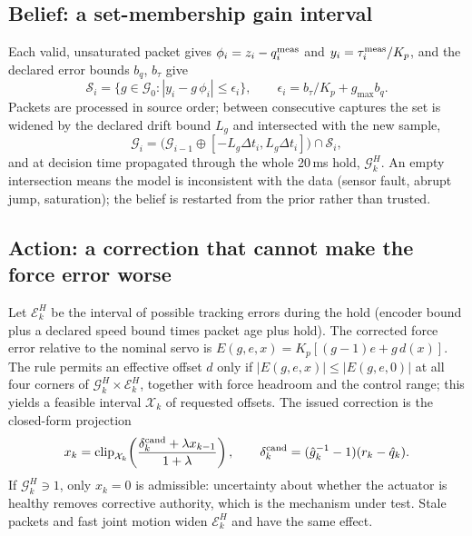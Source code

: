 \documentclass[10pt,twocolumn]{article}
\newcommand{\Gset}{\mathcal{G}}
\newcommand{\Eset}{\mathcal{E}}
\newcommand{\Xset}{\mathcal{X}}
\begin{document}
\subsection{Belief: a set-membership gain interval}
Each valid, unsaturated packet gives $\phi_i = z_i - q_i^{\rm meas}$ and $y_i = \tau_i^{\rm
meas}/K_p$, and the declared error bounds $b_q$, $b_\tau$ give
\begin{equation}
\mathcal S_i=\{g\in\Gset_0 : |y_i - g\,\phi_i|\le \epsilon_i\},\qquad
\epsilon_i = b_\tau/K_p + g_{\max} b_q .
\label{eq:sample}
\end{equation}
Packets are processed in source order; between consecutive captures the set is widened by the
declared drift bound $L_g$ and intersected with the new sample,
\begin{equation}
\Gset_i = \big(\Gset_{i-1}\oplus[-L_g\Delta t_i, L_g\Delta t_i]\big)\cap \mathcal S_i ,
\label{eq:update}
\end{equation}
and at decision time propagated through the whole 20\,ms hold, $\Gset_k^H$. An empty
intersection means the model is inconsistent with the data (sensor fault, abrupt jump,
saturation); the belief is restarted from the prior rather than trusted.

\subsection{Action: a correction that cannot make the force error worse}
Let $\Eset_k^H$ be the interval of possible tracking errors during the hold (encoder bound plus
a declared speed bound times packet age plus hold). The corrected force error relative to the
nominal servo is $E(g,e,x)=K_p[(g-1)e + g\,d(x)]$. The rule permits an effective offset $d$
only if $|E(g,e,x)|\le|E(g,e,0)|$ at all four corners of $\Gset_k^H\times\Eset_k^H$, together
with force headroom and the control range; this yields a feasible interval $\Xset_k$ of
requested offsets. The issued correction is the closed-form projection
\begin{equation}
x_k=\operatorname{clip}_{\Xset_k}\!\left(\frac{\delta_k^{\rm cand}+\lambda x_{k-1}}{1+\lambda}\right),
\qquad
\delta_k^{\rm cand}=(\hat g_k^{-1}-1)(r_k-\hat q_k).
\label{eq:proj}
\end{equation}
If $\Gset_k^H\ni 1$, only $x_k=0$ is admissible: uncertainty about whether the actuator is
healthy removes corrective authority, which is the mechanism under test. Stale packets and
fast joint motion widen $\Eset_k^H$ and have the same effect.
\end{document}
